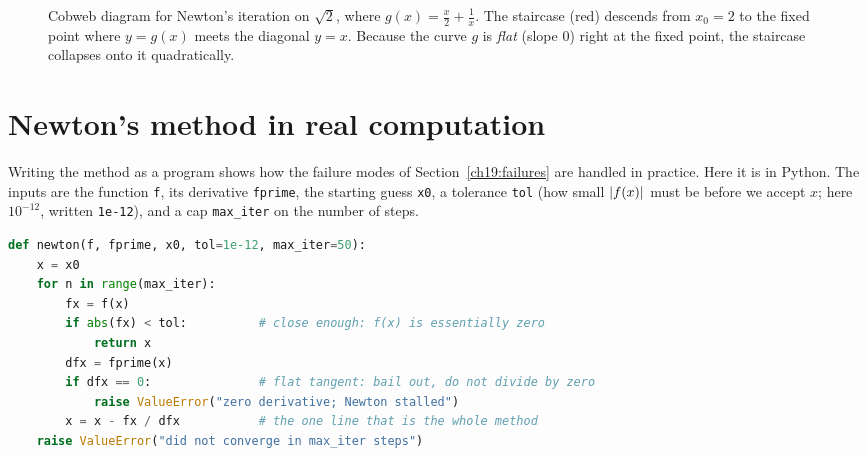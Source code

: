 \begin{figure}[H]
\centering
{}
\caption{Cobweb diagram for Newton's iteration on $\sqrt2$, where $g(x)=\tfrac{x}{2}
+\tfrac1x$. The staircase (red) descends from $x_0=2$ to the fixed point where
$y=g(x)$ meets the diagonal $y=x$. Because the curve $g$ is \emph{flat} (slope $0$)
right at the fixed point, the staircase collapses onto it quadratically.}
\label{ch19:fig-cobweb}
\end{figure}

\section{Newton's method in real computation}
\label{ch19:computing}

Writing the method as a program shows how the failure modes of
Section~\ref{ch19:failures} are handled in practice. Here it is in Python. The
inputs are the function \texttt{f}, its derivative \texttt{fprime}, the starting
guess \texttt{x0}, a tolerance \texttt{tol} (how small $\lvert f(x)\rvert$ must be before
we accept $x$; here $10^{-12}$, written \texttt{1e-12}), and a cap
\texttt{max\_iter} on the number of steps.

\begin{lstlisting}[language=Python]
def newton(f, fprime, x0, tol=1e-12, max_iter=50):
    x = x0
    for n in range(max_iter):
        fx = f(x)
        if abs(fx) < tol:          # close enough: f(x) is essentially zero
            return x
        dfx = fprime(x)
        if dfx == 0:               # flat tangent: bail out, do not divide by zero
            raise ValueError("zero derivative; Newton stalled")
        x = x - fx / dfx           # the one line that is the whole method
    raise ValueError("did not converge in max_iter steps")
\end{lstlisting}

